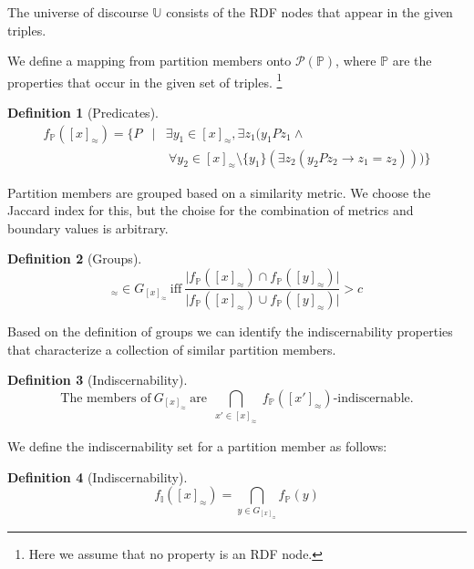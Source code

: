 \documentclass[11pt,a4paper,notitlepage,onecolumn,twoside]{article}
\newtheorem{definition}{Definition}
\begin{document}
The universe of discourse $\mathbb{U}$ consists of the RDF nodes that appear
in the given triples.

We define a mapping from partition members onto $\mathcal{P}(\mathbb{P})$,
where $\mathbb{P}$ are the properties that occur in the given set of triples.
\footnote{Here we assume that no property is an RDF node.}

\begin{definition}[Predicates]
\begin{eqnarray}
f_{\mathbb{P}}([x]_{\approx}) = \{ P &\vert&
    \exists y_1 \in [x]_{\approx}, \exists z_1 (y_1Pz_1 \land \\
    & & \  \forall y_2 \in [x]_{\approx} \setminus \{ y_1 \}
    (\exists z_2 (y_2Pz_2 \rightarrow z_1 = z_2))) \} \nonumber
\end{eqnarray}
\end{definition}

Partition members are grouped based on a similarity metric.
We choose the Jaccard index for this, but the choise for the combination
of metrics and boundary values is arbitrary.

\begin{definition}[Groups]
\begin{equation}
[y]_{\approx} \in G_{[x]_{\approx}} \  \text{iff} \ 
\frac{\vert f_{\mathbb{P}}([x]_{\approx}) \cap f_{\mathbb{P}}([y]_{\approx}) \vert}
     {\vert f_{\mathbb{P}}([x]_{\approx}) \cup f_{\mathbb{P}}([y]_{\approx}) \vert}
     > c
\end{equation}
\end{definition}

Based on the definition of groups we can identify the indiscernability
properties that characterize a collection of similar partition members.

\begin{definition}[Indiscernability]
\begin{equation}
\text{The members of} \  G_{[x]_{\approx}} \  \text{are} \ 
\underset{\substack{x' \in [x]_{\approx}}}{\operatorname{\bigcap}} f_{\mathbb{P}}([x']_{\approx})
\text{-indiscernable}.
\end{equation}
\end{definition}

We define the indiscernability set for a partition member as follows:

\begin{definition}[Indiscernability]
\begin{equation}
f_{\mathbb{I}}([x]_{\approx}) = \bigcap_{y \in G_{[x]_{\approx}}} f_{\mathbb{P}}(y)
\end{equation}
\end{definition}
\end{document}
